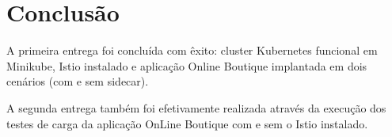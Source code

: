 \documentclass[12pt,a4paper]{report}
\begin{document}

\chapter{Conclusão}
A primeira entrega foi concluída com êxito: cluster Kubernetes funcional em
Minikube, Istio instalado e aplicação Online Boutique implantada em dois
cenários (com e sem sidecar).

A segunda entrega também foi efetivamente realizada através da execução dos testes de carga da aplicação OnLine Boutique com e sem o Istio instalado.

%
\printbibliography[title={Referências}]
\end{document}
